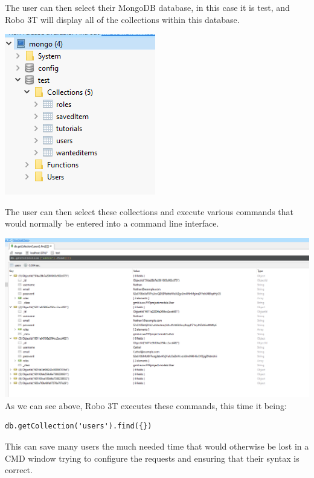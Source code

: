 The user can then select their MongoDB database, in this case it is test, and Robo 3T will display all of the collections within this database. \par
\includegraphics[]{img/robo-collections.PNG} \par
The user can then select these collections and execute various commands that would normally be entered into a command line interface. \par
\includegraphics[scale=0.4]{img/robo-users.PNG} \newline
As we can see above, Robo 3T executes these commands, this time it being: 
\begin{verbatim}
db.getCollection('users').find({})
\end{verbatim}
This can save many users the much needed time that would otherwise be lost in a CMD window trying to configure the requests and ensuring that their syntax is correct.


